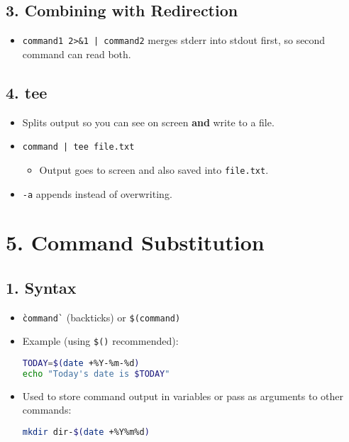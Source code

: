 \documentclass[a4paper]{report}
\begin{document}
\subsection*{3. Combining with Redirection}
\begin{itemize}
    \item \texttt{command1 2>\&1 | command2} merges stderr into stdout first, so second command can read both.
\end{itemize}

\subsection*{4. tee}
\begin{itemize}
    \item Splits output so you can see on screen \textbf{and} write to a file.  
    \item \texttt{command | tee file.txt}
    \begin{itemize}
        \item Output goes to screen and also saved into \texttt{file.txt}.
    \end{itemize}
    \item \texttt{-a} appends instead of overwriting.
\end{itemize}

\section*{5. Command Substitution}

\subsection*{1. Syntax}
\begin{itemize}
    \item \texttt{\`command\`} (backticks) or \texttt{\$(command)}
    \item Example (using \texttt{\$()} recommended):

\begin{lstlisting}[language=bash]
TODAY=$(date +%Y-%m-%d)
echo "Today's date is $TODAY"
\end{lstlisting}

    \item Used to store command output in variables or pass as arguments to other commands:

\begin{lstlisting}[language=bash]
mkdir dir-$(date +%Y%m%d)
\end{lstlisting}
\end{itemize}
\end{document}
